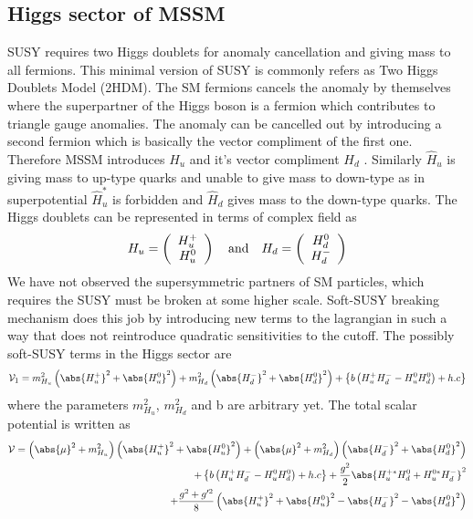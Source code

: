 \subsection{Higgs sector of MSSM}\label{subsec:higgsmssm}
SUSY requires two Higgs doublets for anomaly cancellation and giving mass to all fermions. This minimal version of SUSY is commonly refers as Two Higgs Doublets Model (2HDM). The SM fermions cancels the anomaly by themselves where the superpartner of the Higgs boson is a fermion which contributes to triangle gauge anomalies. The anomaly can be cancelled out by introducing a second fermion which is basically the vector compliment of the first one. Therefore MSSM introduces $H_{u}$ and it's vector compliment $H_{d}$ \cite{Wells:2009kq}. Similarly $\hat{H}_{u}$ is giving mass to up-type quarks and unable to give mass to down-type as in superpotential $\hat{H}_{u}^{*}$ is forbidden and $\hat{H}_{d}$ gives mass to the down-type quarks. The Higgs doublets can be represented in terms of complex field as
\begin{equation}\label{equ:HuHd}
H_{u} = \left(\begin{array}{c}
H^{+}_{u}\\
H^{0}_{u}
\end{array}\right) \quad \textnormal{and} \quad
H_{d} = \left(\begin{array}{c}
H^{0}_{d}\\
H^{-}_{d}
\end{array}\right) 
\end{equation} 
We have not observed the supersymmetric partners of SM particles, which requires the SUSY must be broken at some higher scale. Soft-SUSY breaking mechanism does this job by introducing new terms to the lagrangian in such a way that does not reintroduce quadratic sensitivities to the cutoff. The possibly soft-SUSY terms in the Higgs sector are
\begin{equation}\label{equ:softsusyHiggs}
\mathcal{V}_{1} = m^{2}_{H_{u}} \left( \abs{H^{+}_{u}}^{2} + \abs{H^{0}_{u}}^{2} \right) + 
m^{2}_{H_{d}} \left( \abs{H^{-}_{d}}^{2} + \abs{H^{0}_{d}}^{2} \right) + 
\left\{ b\left(H^{+}_{u}H^{-}_{d} - H^{0}_{u}H^{0}_{d}\right) + h.c  \right\}
\end{equation} 
where the parameters $m^{2}_{H_{u}}$, $m^{2}_{H_{d}}$ and b are arbitrary yet. The total scalar potential is written as \cite{phd_thesis:mssm}
\begin{equation}\label{equ:totallagmssm}
\begin{split}
\mathcal{V} = \left(\abs{\mu}^{2} + m^{2}_{H_{u}}\right) \left( \abs{H^{+}_{u}}^{2} + \abs{H^{0}_{u}}^{2} \right)
+\left(\abs{\mu}^{2} + m^{2}_{H_{d}}\right) \left( \abs{H^{-}_{d}}^{2} + \abs{H^{0}_{d}}^{2} \right)\\
+ \left\{ b\left(H^{+}_{u}H^{-}_{d} - H^{0}_{u}H^{0}_{d}\right) + h.c  \right\} +
\frac{g^{2}}{2}\abs{H^{+*}_{u}H^{0}_{d} + H^{0*}_{u}H^{-}_{d}}^{2}\\
+\frac{g^{2}+g'^{2}}{8}\left( \abs{H^{+}_{u}}^{2} + \abs{H^{0}_{u}}^{2} -  \abs{H^{-}_{d}}^{2} - \abs{H^{0}_{d}}^{2}\right)
\end{split}
\end{equation}
